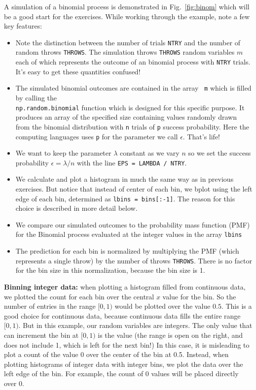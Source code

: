 A simulation of a binomial process is demonstrated in
Fig.~\ref{fig:binom} which will be a good start for the exercises.
While working through the example, note a few key features:
\begin{itemize}

\item Note the distinction between the number of trials {\tt NTRY} and
  the number of random throws {\tt THROWS}.  The simulation throws
  {\tt THROWS} random variables $m$ each of which represents the
  outcome of an binomial process with {\tt NTRY} trials.  It's easy to
  get these quantities confused!

\item The simulated binomial outcomes are contained in the array {\tt
  m} which is filled by calling the \\ {\tt np.random.binomial}
  function which is designed for this specific purpose.  It produces
  an array of the specified size containing values randomly drawn from the
  binomial distribution with {\tt n} trials of {\tt p} success probability.
  Here the computing languages uses {\tt p} for the parameter we call
  $\epsilon$.  That's life!

\item We want to keep the parameter $\lambda$ constant as we vary $n$ so we set the success probability $\epsilon = \lambda / n$ with the line {\tt EPS = LAMBDA / NTRY}.

\item We calculate and plot a histogram in much the same way as in
  previous exercises.  But notice that instead of center of each bin,
  we bplot using the left edge of each bin, determined as {\tt lbins =
    bins[:-1]}.  The reason for this choice is described in more
  detail below.

\item We compare our simulated outcomes to the probability mass function (PMF) for the Binomial process evaluated at the integer values in the array {\tt lbins}

\item The prediction for each bin is normalized by multiplying the PMF (which represents a single throw) by the number of throws {\tt THROWS}.  There is no factor for the bin size in this normalization, because the bin size is 1.

  
\end{itemize}

{\bf Binning integer data:} when plotting a histogram filled from
continuous data, we plotted the count for each bin over the central
$x$ value for the bin.  So the number of entries in the range $[0,1)$
would be plotted over the value $0.5$.  This is a good choice for
continuous data, because continuous data fills the entire range
$[0,1)$.  But in this example, our random variables are integers.  The
only value that can increment the bin at $[0,1)$ is the value
(the range is open on the right, and does not include 1, which is left
for the next bin!)  In this case, it is misleading to plot a count
of the value 0 over the center of the bin at 0.5.  Instead, when
plotting histograms of integer data with integer bins, we plot the
data over the left edge of the bin.  For example, the count of 0
values will be placed directly over 0.

